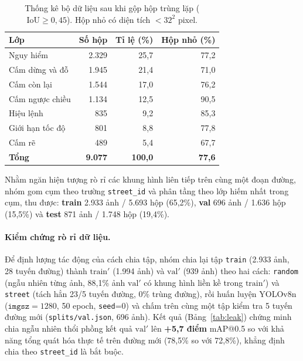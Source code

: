 \documentclass[11pt]{article}
\begin{document}
\begin{table}[t]
\centering
\small
\begin{tabular}{lrrr}
\toprule
\textbf{Lớp} & \textbf{Số hộp} & \textbf{Tỉ lệ (\%)} & \textbf{Hộp nhỏ (\%)} \\
\midrule
Nguy hiểm        & 2.329 & 25,7 & 77,2 \\
Cấm dừng và đỗ   & 1.945 & 21,4 & 71,0 \\
Cấm còn lại      & 1.544 & 17,0 & 76,2 \\
Cấm ngược chiều  & 1.134 & 12,5 & 90,5 \\
Hiệu lệnh        &   835 &  9,2 & 85,3 \\
Giới hạn tốc độ  &   801 &  8,8 & 77,8 \\
Cấm rẽ           &   489 &  5,4 & 67,7 \\
\midrule
\textbf{Tổng}    & \textbf{9.077} & \textbf{100,0} & \textbf{77,6} \\
\bottomrule
\end{tabular}
\caption{Thống kê bộ dữ liệu sau khi gộp hộp trùng lặp ($\text{IoU} \ge 0{,}45$). Hộp nhỏ có diện tích $<32^2$ pixel.}
\label{tab:eda}
\end{table}

Nhằm ngăn hiện tượng rò rỉ các khung hình liên tiếp trên cùng một đoạn đường, nhóm gom cụm theo trường \texttt{street\_id} và phân tầng theo lớp hiếm nhất trong cụm, thu được: \textbf{train} 2.933 ảnh / 5.693 hộp (65,2\%), \textbf{val} 696 ảnh / 1.636 hộp (15,5\%) và \textbf{test} 871 ảnh / 1.748 hộp (19,4\%).

\paragraph{Kiểm chứng rò rỉ dữ liệu.}
Để định lượng tác động của cách chia tập, nhóm chia lại tập \texttt{train} (2.933 ảnh, 28 tuyến đường) thành $\text{train}'$ (1.994 ảnh) và $\text{val}'$ (939 ảnh) theo hai cách: \texttt{random} (ngẫu nhiên từng ảnh, 88,1\% ảnh $\text{val}'$ có khung hình liền kề trong $\text{train}'$) và \texttt{street} (tách hẳn 23/5 tuyến đường, 0\% trùng đường), rồi huấn luyện YOLOv8n ($\texttt{imgsz}=1280$, 50 epoch, \texttt{seed}=0) và chấm trên cùng một tập kiểm tra 5 tuyến đường mới (\texttt{splits/val.json}, 696 ảnh). Kết quả (Bảng~\ref{tab:leak}) chứng minh chia ngẫu nhiên thổi phồng kết quả $\text{val}'$ lên \textbf{+5,7 điểm} mAP@0.5 so với khả năng tổng quát hóa thực tế trên đường mới (78,5\% so với 72,8\%), khẳng định chia theo \texttt{street\_id} là bắt buộc.
\end{document}
